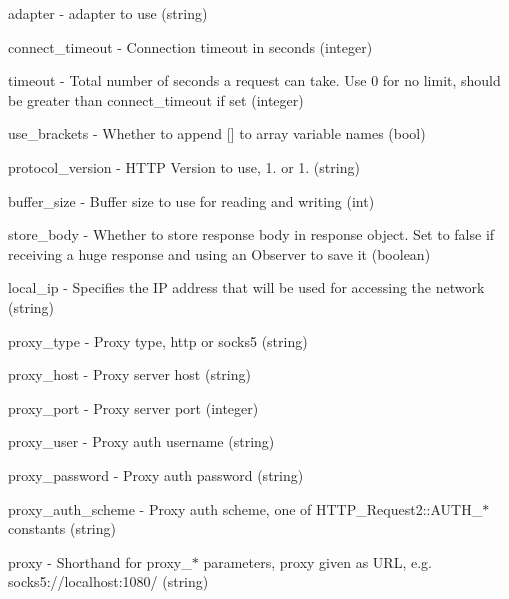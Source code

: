 \begin{DoxyItemize}
\item \textquotesingle{}adapter\textquotesingle{} -\/ adapter to use (string) 
\item \textquotesingle{}connect\+\_\+timeout\textquotesingle{} -\/ Connection timeout in seconds (integer) 
\item \textquotesingle{}timeout\textquotesingle{} -\/ Total number of seconds a request can take. Use 0 for no limit, should be greater than \textquotesingle{}connect\+\_\+timeout\textquotesingle{} if set (integer) 
\item \textquotesingle{}use\+\_\+brackets\textquotesingle{} -\/ Whether to append \mbox{[}\mbox{]} to array variable names (bool) 
\item \textquotesingle{}protocol\+\_\+version\textquotesingle{} -\/ H\+T\+TP Version to use, \textquotesingle{}1.\textquotesingle{} or \textquotesingle{}1.\textquotesingle{} (string) 
\item \textquotesingle{}buffer\+\_\+size\textquotesingle{} -\/ Buffer size to use for reading and writing (int) 
\item \textquotesingle{}store\+\_\+body\textquotesingle{} -\/ Whether to store response body in response object. Set to false if receiving a huge response and using an Observer to save it (boolean) 
\item \textquotesingle{}local\+\_\+ip\textquotesingle{} -\/ Specifies the IP address that will be used for accessing the network (string) 
\item \textquotesingle{}proxy\+\_\+type\textquotesingle{} -\/ Proxy type, \textquotesingle{}http\textquotesingle{} or \textquotesingle{}socks5\textquotesingle{} (string) 
\item \textquotesingle{}proxy\+\_\+host\textquotesingle{} -\/ Proxy server host (string) 
\item \textquotesingle{}proxy\+\_\+port\textquotesingle{} -\/ Proxy server port (integer) 
\item \textquotesingle{}proxy\+\_\+user\textquotesingle{} -\/ Proxy auth username (string) 
\item \textquotesingle{}proxy\+\_\+password\textquotesingle{} -\/ Proxy auth password (string) 
\item \textquotesingle{}proxy\+\_\+auth\+\_\+scheme\textquotesingle{} -\/ Proxy auth scheme, one of H\+T\+T\+P\+\_\+\+Request2\+::\+A\+U\+T\+H\+\_\+$\ast$ constants (string) 
\item \textquotesingle{}proxy\textquotesingle{} -\/ Shorthand for proxy\+\_\+$\ast$ parameters, proxy given as U\+RL, e.\+g. \textquotesingle{}socks5\+://localhost\+:1080/\textquotesingle{} (string) 

\end{DoxyItemize}
